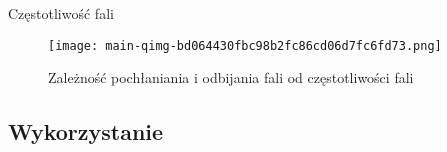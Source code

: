 \documentclass{beamer}
\begin{document}










\begin{frame}{Częstotliwość fali}

\begin{figure}
    \centering
    \texttt{[image: main-qimg-bd064430fbc98b2fc86cd06d7fc6fd73.png]}
    \caption{Zależność pochłaniania i odbijania fali od częstotliwości fali}
    \label{xd}
\end{figure}
    
\end{frame}

\subsection{Wykorzystanie}
\end{document}
